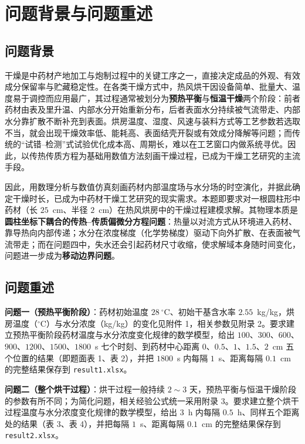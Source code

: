 \section{问题背景与问题重述}

\subsection{问题背景}

干燥是中药材产地加工与炮制过程中的关键工序之一，直接决定成品的外观、有效成分保留率与贮藏稳定性\cite{review2021}。在各类干燥方式中，热风烘干因设备简单、批量大、温度易于调控而应用最广，其过程通常被划分为\textbf{预热平衡}与\textbf{恒温干燥}两个阶段：前者药材由表及里升温、内部水分开始重新分布，后者表面水分持续被气流带走、内部水分靠扩散不断补充到表面。烘房温度、湿度、风速与装料方式等工艺参数若选取不当，就会出现干燥效率低、能耗高、表面结壳开裂或有效成分降解等问题；而传统的``试错--检测''式试验优化成本高、周期长，难以在工艺窗口内做系统寻优。因此，以传热传质方程为基础用数值方法刻画干燥过程，已成为干燥工艺研究的主流手段\cite{mujumdar2015,dincer2016}。

因此，用数理分析与数值仿真刻画药材内部温度场与水分场的时空演化，并据此确定干燥时长，已成为中药材干燥工艺研究的现实需求。本题即要求对一根圆柱形中药材（长 $25$~cm、半径 $2$~cm）在热风烘房中的干燥过程建模求解。其物理本质是\textbf{圆柱坐标下耦合的传热--传质偏微分方程问题}：热量以对流方式从环境进入药材、靠导热向内部传递；水分在浓度梯度（化学势梯度）驱动下向外扩散、在表面被气流带走；而在问题四中，失水还会引起药材尺寸收缩，使求解域本身随时间变化，问题进一步成为\textbf{移动边界问题}\cite{kowalski2003}。

\subsection{问题重述}

\textbf{问题一（预热平衡阶段）}：药材初始温度 $28~^\circ$C、初始干基含水率 $2.55$~kg/kg，烘房温度（$^\circ$C）与水分浓度（kg/kg）的变化见附件 1，相关参数见附录 2。要求建立预热平衡阶段药材温度与水分浓度变化规律的数学模型，给出 $100$、$300$、$600$、$900$、$1200$、$1500$、$1800$~s 七个时刻、到药材中心距离 $0$、$0.5$、$1$、$1.5$、$2$~cm 五个位置的结果（即题面表 1、表 2），并把 $1800$~s 内每隔 $1$~s、距离每隔 $0.1$~cm 的完整结果保存到 \texttt{result1.xlsx}。

\textbf{问题二（整个烘干过程）}：烘干过程一般持续 $2\sim3$ 天，预热平衡与恒温干燥阶段的参数有所不同；为简化问题，相关经验公式统一采用附录 3。要求建立整个烘干过程温度与水分浓度变化规律的数学模型，给出 $3$~h 内每隔 $0.5$~h、同样五个距离处的结果（表 3、表 4），并把每隔 $1$~s、距离每隔 $0.1$~cm 的完整结果保存到 \texttt{result2.xlsx}。

